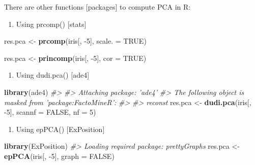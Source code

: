 \documentclass[]{book}
\newenvironment{Shaded}{\begin{snugshade}}{\end{snugshade}}
\newcommand{\CommentTok}[1]{\textcolor[rgb]{0.56,0.35,0.01}{\textit{#1}}}
\newcommand{\DataTypeTok}[1]{\textcolor[rgb]{0.13,0.29,0.53}{#1}}
\newcommand{\DecValTok}[1]{\textcolor[rgb]{0.00,0.00,0.81}{#1}}
\newcommand{\KeywordTok}[1]{\textcolor[rgb]{0.13,0.29,0.53}{\textbf{#1}}}
\newcommand{\NormalTok}[1]{#1}
\newcommand{\OtherTok}[1]{\textcolor[rgb]{0.56,0.35,0.01}{#1}}
\newcommand{\StringTok}[1]{\textcolor[rgb]{0.31,0.60,0.02}{#1}}
\providecommand{\tightlist}{%
  \setlength{\itemsep}{0pt}\setlength{\parskip}{0pt}}
\begin{document}
There are other functions {[}packages{]} to compute PCA in R:

\begin{enumerate}
\def\labelenumi{\arabic{enumi}.}
\tightlist
\item
  Using prcomp() {[}stats{]}
\end{enumerate}

\begin{Shaded}
\begin{Highlighting}[]
\NormalTok{res.pca <-}\StringTok{ }\KeywordTok{prcomp}\NormalTok{(iris[, }\DecValTok{-5}\NormalTok{], }\DataTypeTok{scale. =} \OtherTok{TRUE}\NormalTok{)}
\end{Highlighting}
\end{Shaded}

\begin{Shaded}
\begin{Highlighting}[]
\NormalTok{res.pca <-}\StringTok{ }\KeywordTok{princomp}\NormalTok{(iris[, }\DecValTok{-5}\NormalTok{], }\DataTypeTok{cor =} \OtherTok{TRUE}\NormalTok{)}
\end{Highlighting}
\end{Shaded}

\begin{enumerate}
\def\labelenumi{\arabic{enumi}.}
\setcounter{enumi}{2}
\tightlist
\item
  Using dudi.pca() {[}ade4{]}
\end{enumerate}

\begin{Shaded}
\begin{Highlighting}[]
\KeywordTok{library}\NormalTok{(ade4)}
\CommentTok{#> }
\CommentTok{#> Attaching package: 'ade4'}
\CommentTok{#> The following object is masked from 'package:FactoMineR':}
\CommentTok{#> }
\CommentTok{#>     reconst}
\NormalTok{res.pca <-}\StringTok{ }\KeywordTok{dudi.pca}\NormalTok{(iris[, }\DecValTok{-5}\NormalTok{], }\DataTypeTok{scannf =} \OtherTok{FALSE}\NormalTok{, }\DataTypeTok{nf =} \DecValTok{5}\NormalTok{)}
\end{Highlighting}
\end{Shaded}

\begin{enumerate}
\def\labelenumi{\arabic{enumi}.}
\setcounter{enumi}{3}
\tightlist
\item
  Using epPCA() {[}ExPosition{]}
\end{enumerate}

\begin{Shaded}
\begin{Highlighting}[]
\KeywordTok{library}\NormalTok{(ExPosition)}
\CommentTok{#> Loading required package: prettyGraphs}
\NormalTok{res.pca <-}\StringTok{ }\KeywordTok{epPCA}\NormalTok{(iris[, }\DecValTok{-5}\NormalTok{], }\DataTypeTok{graph =} \OtherTok{FALSE}\NormalTok{)}
\end{Highlighting}
\end{Shaded}
\end{document}

